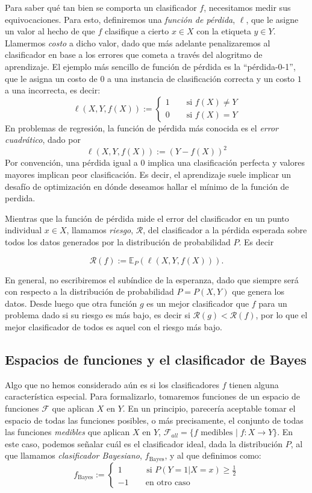 \documentclass{report}
\begin{document}
Para saber qué tan bien se comporta un clasificador $f$, necesitamos medir sus equivocaciones. Para esto, definiremos una \textit{función de pérdida},
$\ell$, que le asigne un valor al hecho de que $f$ clasifique a cierto $x\in X$ con la etiqueta $y\in Y$. Llamermos \textit{costo} a dicho valor,
dado que más adelante penalizaremos al clasificador en base a los errores que cometa a través del alogritmo de aprendizaje.
El ejemplo más sencillo de función de pérdida es la ``pérdida-0-1'', que le asigna un costo de $0$ a una instancia de clasificación correcta y un costo
$1$ a una incorrecta, es decir:
\[
\ell(X,Y,f(X)):= \begin{cases}
    1 \qquad \text{si } f(X) \neq Y \\
    0 \qquad \text{si } f(X) = Y
\end{cases}
\]
En problemas de regresión, la función de pérdida más conocida es el \textit{error cuadrático}, dado por
\[
\ell(X,Y,f(X)):= (Y-f(X))^2
\]
Por convención, una pérdida igual a $0$ implica una clasificación perfecta y valores mayores implican peor clasificación. Es decir,
el aprendizaje suele implicar un desafío de optimización en dónde deseamos hallar el mínimo de la función de perdida.

Mientras que la función de pérdida mide el error del clasificador en un punto individual $x\in X$, llamamos \textit{riesgo}, $\mathcal{R}$,
del clasificador a la pérdida esperada sobre todos los datos generados por la distribución de probabilidad $P$. Es decir

\[
\mathcal{R}(f) := \mathbb{E}_{P}\left( \ell(X,Y,f(X)) \right).
\]

En general, no escribiremos el subíndice de la esperanza, dado que siempre será con respecto a la distribución de probabilidad $P=P(X,Y)$ que genera los datos.
Desde luego que otra función $g$ es un mejor clasificador que $f$ para un problema dado si su riesgo es más bajo, es decir si $\mathcal{R}(g)
< \mathcal{R}(f)$, por lo que el mejor clasificador de todos es aquel con el riesgo más bajo.

\subsection{Espacios de funciones y el clasificador de Bayes}

Algo que no hemos considerado aún es si los clasificadores $f$ tienen alguna característica especial. Para formalizarlo, tomaremos funciones de un
espacio de funciones $\mathcal{F}$ que aplican $X$ en $Y$. En un principio, parecería aceptable tomar el espacio de todas las funciones posibles, o
más precisamente, el conjunto de todas las funciones \textit{medibles} que aplican $X$ en $Y$, $\mathcal{F}_{all} = \{f \text{ medibles  } |
\; f: X \rightarrow Y \}$. En este caso, podemos señalar cuál es el clasificador ideal, dada la distribución $P$, al que llamamos
\textit{clasificador Bayesiano}, $f_{\text{Bayes}}$, y al que definimos como:
\[
f_{\text{Bayes}} := \begin{cases}
1 \qquad \; \; \text{  si } P(Y=1 | X=x) \geq \frac{1}{2}\\
-1 \qquad \text{en otro caso }
\end{cases}
\]
\end{document}
